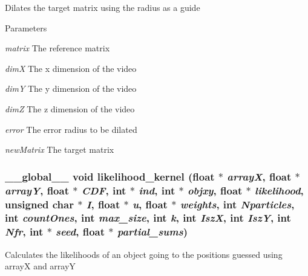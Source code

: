 \label{ex__particle__CUDA__float_8cu_a707e839d9152f9bf820dee64c6627f5b}
Dilates the target matrix using the radius as a guide 
\begin{DoxyParams}{Parameters}
\item[{\em matrix}]The reference matrix \item[{\em dimX}]The x dimension of the video \item[{\em dimY}]The y dimension of the video \item[{\em dimZ}]The z dimension of the video \item[{\em error}]The error radius to be dilated \item[{\em newMatrix}]The target matrix \end{DoxyParams}
\hypertarget{ex__particle__CUDA__float_8cu_af316957165b8ace93273f0b97dbdcc19}{
\subsubsection[{likelihood\_\-kernel}]{\setlength{\rightskip}{0pt plus 5cm}\_\-\_\-global\_\-\_\- void likelihood\_\-kernel (float $\ast$ {\em arrayX}, \/  float $\ast$ {\em arrayY}, \/  float $\ast$ {\em CDF}, \/  int $\ast$ {\em ind}, \/  int $\ast$ {\em objxy}, \/  float $\ast$ {\em likelihood}, \/  unsigned char $\ast$ {\em I}, \/  float $\ast$ {\em u}, \/  float $\ast$ {\em weights}, \/  int {\em Nparticles}, \/  int {\em countOnes}, \/  int {\em max\_\-size}, \/  int {\em k}, \/  int {\em IszX}, \/  int {\em IszY}, \/  int {\em Nfr}, \/  int $\ast$ {\em seed}, \/  float $\ast$ {\em partial\_\-sums})}}
\label{ex__particle__CUDA__float_8cu_af316957165b8ace93273f0b97dbdcc19}
Calculates the likelihoods of an object going to the positions guessed using arrayX and arrayY 
